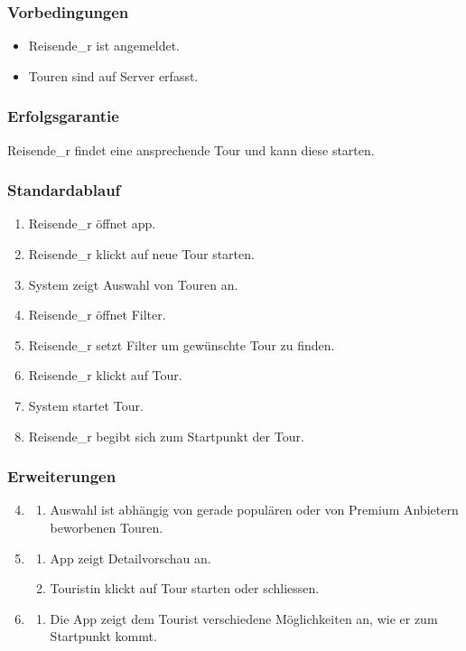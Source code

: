 \documentclass[a4paper,10pt,xetex]{article}
\begin{document}
\subsubsection{Vorbedingungen}\label{vorbedingungen}
\begin{itemize}
  \item Reisende\_r ist angemeldet.
  \item Touren sind auf Server erfasst.
\end{itemize}


\subsubsection{Erfolgsgarantie}\label{erfolgsgarantie}
Reisende\_r findet eine ansprechende Tour und kann diese starten.


\subsubsection{Standardablauf}\label{standardablauf}
\begin{enumerate}
  \item Reisende\_r öffnet app.
  \item Reisende\_r klickt auf neue Tour starten.
  \item System zeigt Auswahl von Touren an.
  \item Reisende\_r öffnet Filter.
  \item Reisende\_r setzt Filter um gewünschte Tour zu finden.
  \item Reisende\_r klickt auf Tour.
  \item System startet Tour.
  \item Reisende\_r begibt sich zum Startpunkt der Tour.
\end{enumerate}


\subsubsection{Erweiterungen}\label{erweiterungen}
\begin{enumerate}
  \setcounter{enumi}{3}
  \item
    \begin{enumerate}
      \item Auswahl ist abhängig von gerade populären oder von Premium Anbietern beworbenen Touren.
    \end{enumerate}

  \setcounter{enumi}{6}
  \item
    \begin{enumerate}
      \item App zeigt Detailvorschau an.
      \item Touristin klickt auf Tour starten oder schliessen.
    \end{enumerate}

  \setcounter{enumi}{8}
  \item
    \begin{enumerate}
      \item Die App zeigt dem Tourist verschiedene Möglichkeiten an, wie er zum Startpunkt kommt.
    \end{enumerate}
\end{enumerate}
\end{document}

